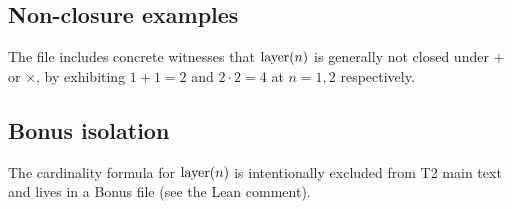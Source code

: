 \subsection{Non-closure examples}
The file includes concrete witnesses that $\operatorname{layer}(n)$ is generally not closed under $+$ or $\times$,
by exhibiting $1+1=2$ and $2\cdot 2=4$ at $n=1,2$ respectively.

\subsection{Bonus isolation}
The cardinality formula for $\operatorname{layer}(n)$ is intentionally excluded from T2 main text and lives in a
Bonus file (see the Lean comment).
